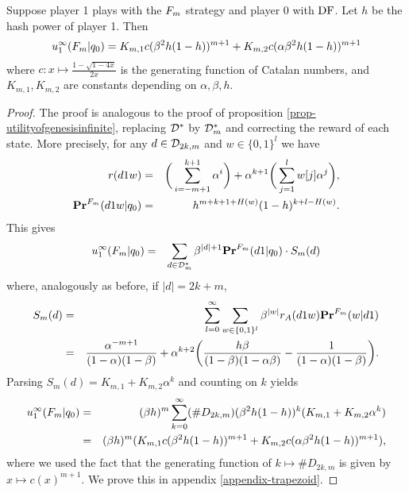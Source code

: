 \begin{myprop*}
	Suppose player 1 plays with the $F_m$ strategy and player 0 with $\text{\rm DF}$. Let $h$ be the hash power of player 1. Then
	\begin{eqnarray*}
		u_1^\infty(F_m|q_0) =K_{m,1}c(\beta^2h(1-h))^{m+1}+K_{m,2}c(\alpha\beta^2h(1-h))^{m+1}
	\end{eqnarray*}
	where $c:x\mapsto \frac{1-\sqrt{1-4x}}{2x}$ is the generating function of Catalan numbers, and $K_{m,1},K_{m,2}$ are constants depending on $\alpha,\beta,h$.
\end{myprop*}
\begin{proof}
The proof is analogous to the proof of proposition \ref{prop-utilityofgenesisinfinite}, replacing $\mathcal{D}^\ast$ by $\mathcal{D}_{m}^\ast$ and correcting the reward of each state. More precisely, for any $d\in \mathcal{D}_{2k,m}$ and $w\in \{0,1\}^l$ we have
\begin{eqnarray*}
 r(d1w) &=& \bigg(\sum_{i=-m+1}^{k+1}\alpha^i\bigg)+\alpha^{k+1}\bigg(\sum_{j=1}^{l}w[j]\alpha^j\bigg),\\
 \mathbf{Pr}^{F_m}(d1w|q_0) &=& h^{m+k+1+H(w)}(1-h)^{k+l-H(w)}.
\end{eqnarray*}
This gives
	\begin{eqnarray*}
	u^\infty_1(F_m|q_0)&=& \sum_{d\in \mathcal{D}^\ast_{m}}\beta ^{|d|+1}\mathbf{Pr}^{F_m} (d1|q_0) \cdot S_m(d)
\end{eqnarray*}
where, analogously as before, if $|d|=2k+m$,
\begin{eqnarray*}
	S_m(d)      &=& \sum_{l=0}^{\infty}\sum_{w\in \{0,1\}^l}\beta^{|w|}r_A(d1w)\mathbf{Pr}^{F_m}(w|d1)\\
	&=& \frac{\alpha^{-m+1}}{(1-\alpha)(1-\beta)}+\alpha^{k+2}\bigg(\frac{h\beta}{(1-\beta)(1-\alpha\beta)}-\frac{1}{(1-\alpha)(1-\beta)}\bigg).
\end{eqnarray*}
Parsing $S_m(d)=K_{m,1}+K_{m,2}\alpha^{k}$ and counting on $k$ yields
\begin{eqnarray*}
	u^\infty_1(F_m|q_0)&=& (\beta h)^m \sum_{k=0}^{\infty}(\# D_{2k,m})(\beta^2 h(1-h))^k(K_{m,1}+K_{m,2}\alpha^k)\\
                          &=& (\beta h)^m(K_{m,1}c(\beta^2 h(1-h))^{m+1}+K_{m,2}c(\alpha\beta^2 h (1-h))^{m+1}),
\end{eqnarray*}
where we used the fact that the generating function of $k\mapsto \#D_{2k,m}$ is given by $x\mapsto c(x)^{m+1}$. We prove this in appendix \ref{appendix-trapezoid}.
\end{proof}


